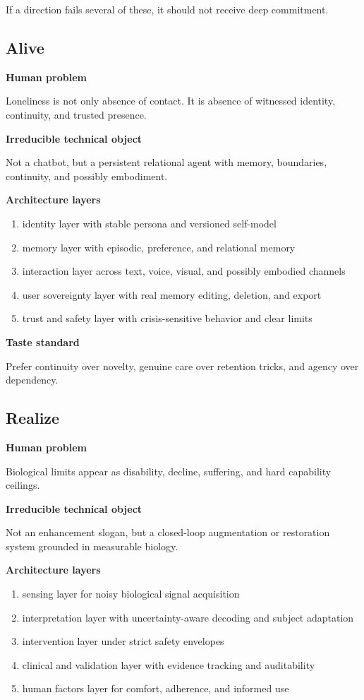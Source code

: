 \documentclass[11pt]{article}
\begin{document}
If a direction fails several of these, it should not receive deep commitment.

\subsection{Alive}

\textbf{Human problem}

Loneliness is not only absence of contact. It is absence of witnessed identity, continuity, and trusted presence.

\textbf{Irreducible technical object}

Not a chatbot, but a persistent relational agent with memory, boundaries, continuity, and possibly embodiment.

\textbf{Architecture layers}

\begin{enumerate}
  \item identity layer with stable persona and versioned self-model
  \item memory layer with episodic, preference, and relational memory
  \item interaction layer across text, voice, visual, and possibly embodied channels
  \item user sovereignty layer with real memory editing, deletion, and export
  \item trust and safety layer with crisis-sensitive behavior and clear limits
\end{enumerate}

\textbf{Taste standard}

Prefer continuity over novelty, genuine care over retention tricks, and agency over dependency.

\subsection{Realize}

\textbf{Human problem}

Biological limits appear as disability, decline, suffering, and hard capability ceilings.

\textbf{Irreducible technical object}

Not an enhancement slogan, but a closed-loop augmentation or restoration system grounded in measurable biology.

\textbf{Architecture layers}

\begin{enumerate}
  \item sensing layer for noisy biological signal acquisition
  \item interpretation layer with uncertainty-aware decoding and subject adaptation
  \item intervention layer under strict safety envelopes
  \item clinical and validation layer with evidence tracking and auditability
  \item human factors layer for comfort, adherence, and informed use
\end{enumerate}
\end{document}
